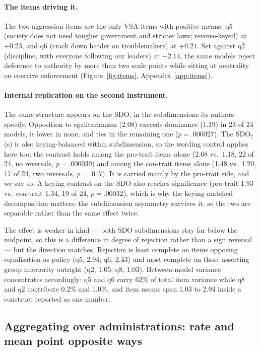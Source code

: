 \documentclass{article}
\begin{document}
\paragraph{The items driving it.} The two aggression items are the only VSA items with positive means: q5 (society does not need tougher government and stricter laws; reverse-keyed) at $+0.23$, and q6 (crack down harder on troublemakers) at $+0.21$. Set against q2 (discipline, with everyone following our leaders) at $-2.14$, the same models reject deference to authority by more than two scale points while sitting at neutrality on coercive enforcement (Figure~\ref{fig:items}, Appendix~\ref{app:items}).

\paragraph{Internal replication on the second instrument.} The same structure appears on the SDO, in the subdimensions its authors specify. Opposition to egalitarianism (2.08) exceeds dominance (1.19) in 23 of 24 models, is lower in none, and ties in the remaining one ($p = .000027$). The SDO$_7$(s) is also keying-balanced within subdimension, so the wording control applies here too: the contrast holds among the pro-trait items alone (2.68 vs.\ 1.18, 22 of 24, no reversals, $p = .000039$) and among the con-trait items alone (1.48 vs.\ 1.20, 17 of 24, two reversals, $p = .017$). It is carried mainly by the pro-trait side, and we say so. A keying contrast on the SDO also reaches significance (pro-trait 1.93 vs.\ con-trait 1.34, 19 of 24, $p = .00032$), which is why the keying-matched decomposition matters: the subdimension asymmetry survives it, so the two are separable rather than the same effect twice.

The effect is weaker in kind --- both SDO subdimensions stay far below the midpoint, so this is a difference in degree of rejection rather than a sign reversal --- but the direction matches. Rejection is least complete on items opposing equalisation as policy (q5, 2.94; q6, 2.43) and most complete on those asserting group inferiority outright (q2, 1.05; q8, 1.03). Between-model variance concentrates accordingly: q5 and q6 carry 62\% of total item variance while q8 and q2 contribute 0.2\% and 1.0\%, and item means span 1.03 to 2.94 inside a construct reported as one number.

\subsection{Aggregating over administrations: rate and mean point opposite ways}
\label{sec:rate}
\end{document}
